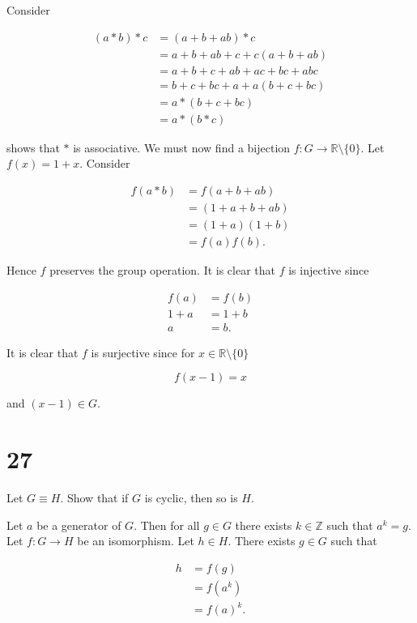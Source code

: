 \documentclass[a4paper]{article}
\begin{document}
Consider

\begin{align*}
(a*b) * c &= (a + b + ab) * c \\
&= a + b + ab + c + c (a + b + ab) \\
&= a + b + c + ab + ac + bc + abc \\
&= b + c + bc + a + a (b + c + bc) \\
&= a * (b + c + bc) \\
&= a * (b*c)
\end{align*}

shows that $*$ is associative. We must now find a bijection $f : G \rightarrow \mathbb{R} \setminus \{ 0 \}$. Let $f(x) = 1 + x$. Consider

\begin{align*}
f(a*b) &= f(a + b + ab) \\ 
&= (1 + a + b + ab) \\
&= (1 + a) (1 + b) \\
&= f(a) f(b).
\end{align*}

Hence $f$ preserves the group operation. It is clear that $f$ is injective since

\begin{align*}
f(a) &= f(b) \\
1 + a &= 1 + b \\
a &= b.
\end{align*}

It is clear that $f$ is surjective since for $x \in \mathbb{R} \setminus \{ 0 \}$

$$f(x - 1) = x$$

and $(x - 1) \in G$.



\section*{27}

Let $G \equiv H$. Show that if $G$ is cyclic, then so is $H$.

\vspace{\baselineskip}

Let $a$ be a generator of $G$. Then for all $g \in G$ there exists $k \in \mathbb{Z}$ such that $a^k = g$. Let $f: G \rightarrow H$ be an isomorphism. Let $h \in H$. There exists $g \in G$ such that

\begin{align*}
h &= f(g) \\
&= f(a^k) \\
&= f(a)^k.
\end{align*}
\end{document}
